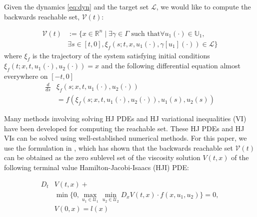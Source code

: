 Given the dynamics \eqref{eq:dyn} and the target set $\mathcal{L}$, we would like to compute the backwards reachable set, $\mathcal{V}(t)$:

\begin{equation}
\begin{aligned}
\mathcal{V}(t) &:= \{x\in\mathbb{R}^n \mid \exists \gamma\in\Gamma \text{ such that} \forall u_1(\cdot)\in\mathbb{U}_1, \\
&\exists s \in [t,0], \xi_f(s; t, x, u_1(\cdot), \gamma[u_1](\cdot)) \in \mathcal{L} \}
\end{aligned}
\end{equation}
where $\xi_f$ is the trajectory of the system satisfying initial conditions $\xi_f(t; x, t, u_1(\cdot), u_2(\cdot))=x$ and the following differential equation almost everywhere on $[-t, 0]$
\begin{equation}
\begin{aligned}
\frac{d}{ds}&\xi_f(s; x, t, u_1(\cdot), u_2(\cdot)) \\
&= f(\xi_f(s; x, t, u_1(\cdot), u_2(\cdot)), u_1(s), u_2(s))
\end{aligned}
\end{equation}

Many methods involving solving HJ PDEs \cite{Mitchell05} and HJ variational inequalities (VI) \cite{Bokanowski10,Barron89,Fisac15} have been developed for computing the reachable set. These HJ PDEs and HJ VIs can be solved using well-established numerical methods. For this paper, we use the formulation in \cite{Mitchell05}, which has shown that the backwards reachable set $\mathcal{V}(t)$ can be obtained as the zero sublevel set of the viscosity solution \cite{Crandall84} $V(t,x)$ of the following terminal value Hamilton-Jacobi-Isaacs (HJI) PDE:

\begin{equation} \label{eq:HJIPDE}
\begin{aligned}
D_t &V(t,x) + \\
&\min \{0, \max_{u_1\in\mathcal{U}_1} \min_{u_2\in\mathcal{U}_2} D_x V(t,x) \cdot f(x,u_1,u_2) \} = 0, \\
&V(0,x) = l(x)
\end{aligned}
\end{equation}

